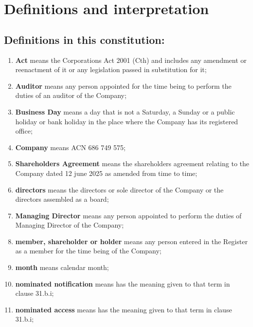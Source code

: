 \section{Definitions and interpretation}

\subsection{Definitions in this constitution:}

\begin{enumerate}[label=(\roman*)]
    \item \textbf{Act} means the Corporations Act 2001 (Cth) and includes any amendment or reenactment of it or any legislation passed in substitution for it;
    
    \item \textbf{Auditor} means any person appointed for the time being to perform the duties of an auditor of the Company;
    
    \item \textbf{Business Day} means a day that is not a Saturday, a Sunday or a public holiday or bank holiday in the place where the Company has its registered office;
    
    \item \textbf{Company} means ACN 686 749 575;
    
    \item \textbf{Shareholders Agreement} means the shareholders agreement relating to the Company dated 12 june 2025 as amended from time to time;
    
    \item \textbf{directors} means the directors or sole director of the Company or the directors assembled as a board;
    
    \item \textbf{Managing Director} means any person appointed to perform the duties of Managing Director of the Company;
    
    \item \textbf{member, shareholder or holder} means any person entered in the Register as a member for the time being of the Company;
    
    \item \textbf{month} means calendar month;
    
    \item \textbf{nominated notification} means has the meaning given to that term in clause 31.b.i;
    
    \item \textbf{nominated access} means has the meaning given to that term in clause 31.b.i;
    

\end{enumerate}
